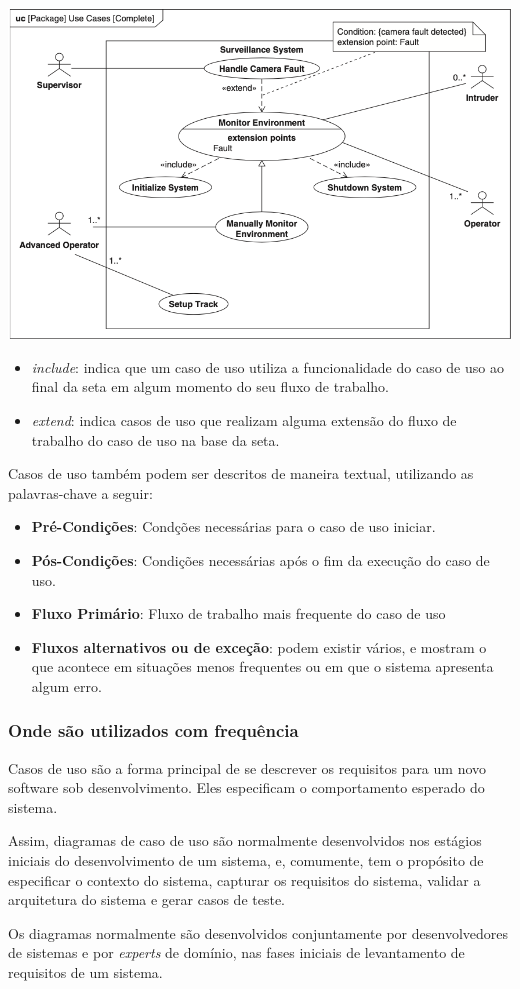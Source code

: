 \includegraphics[width=\textwidth,height=\textheight,keepaspectratio]{figures/diagrama-caso-de-uso-3.png}

\begin{itemize}
\item \textit{include}: indica que um caso de uso utiliza a funcionalidade do caso de uso ao final da seta em algum momento do seu fluxo de trabalho. 
\item \textit{extend}: indica casos de uso que realizam alguma extensão do fluxo de trabalho do caso de uso na base da seta. 
\end{itemize}

Casos de uso também podem ser descritos de maneira textual, utilizando as palavras-chave a seguir:
\begin{itemize}
\item \textbf{Pré-Condições}: Condções necessárias para o caso de uso iniciar.
\item \textbf{Pós-Condições}: Condições necessárias após o fim da execução do caso de uso.
\item \textbf{Fluxo Primário}: Fluxo de trabalho mais frequente do caso de uso
\item \textbf{Fluxos alternativos ou de exceção}: podem existir vários, e mostram o que acontece em situações menos frequentes ou em que o sistema apresenta algum erro.
\end{itemize}

\subsubsection{Onde são utilizados com frequência}

Casos de uso são a forma principal de se descrever os requisitos para um novo software sob desenvolvimento. Eles especificam o comportamento esperado do sistema.

Assim, diagramas de caso de uso são normalmente desenvolvidos nos estágios iniciais do desenvolvimento de um sistema, e, comumente, tem o propósito de especificar o contexto do sistema, capturar os requisitos do sistema, validar a arquitetura do sistema e gerar casos de teste.

Os diagramas normalmente são desenvolvidos conjuntamente por desenvolvedores de sistemas e por \textit{experts} de domínio, nas fases iniciais de levantamento de requisitos de um sistema. 